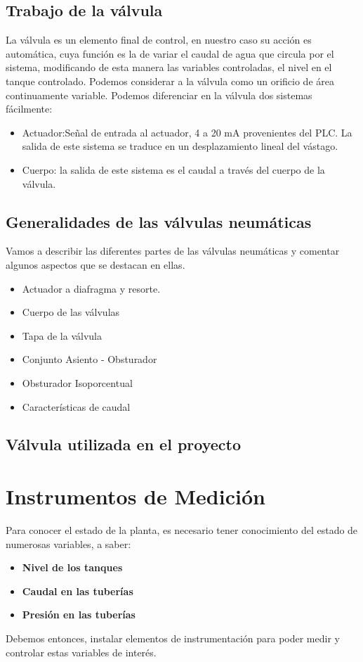 \subsection{Trabajo de la válvula}
La válvula es un elemento final de control, en nuestro caso su acción es
automática, cuya función es la de variar el caudal de agua que circula por el
sistema, modificando de esta manera las variables controladas, el nivel en el
tanque controlado. Podemos considerar a la válvula como un orificio de área 
continuamente variable.
Podemos diferenciar en la válvula dos sistemas fácilmente:

   \begin{itemize}
      \item Actuador:Señal de entrada al actuador, 4 a 20 mA provenientes del 
      PLC.
      La salida de este sistema se traduce en un desplazamiento lineal del 
      vástago.
      \item Cuerpo: la salida de este sistema es el caudal a través del cuerpo
      de la válvula.
    \end{itemize}
    
\subsection{Generalidades de las válvulas neumáticas}
Vamos a describir las diferentes partes de las válvulas neumáticas y comentar 
algunos aspectos que se destacan en ellas.

\begin{itemize}
  \item Actuador a diafragma y resorte.
  \item Cuerpo de las válvulas
  \item Tapa de la válvula
  \item Conjunto Asiento - Obsturador
  \item Obsturador Isoporcentual
  \item Características de caudal
\end{itemize}

\subsection{Válvula utilizada en el proyecto}


\section{Instrumentos de Medición}
\label{sec:InstrumentosMedicion}
Para conocer el estado de la planta, es necesario tener conocimiento del
estado de numerosas variables, a saber:
\begin{itemize}
 \item \textbf{Nivel de los tanques}
 \item \textbf{Caudal en las tuberías}
 \item \textbf{Presión en las tuberías}
\end{itemize}
Debemos entonces, instalar elementos de instrumentación para poder 
medir y controlar estas variables de interés.

